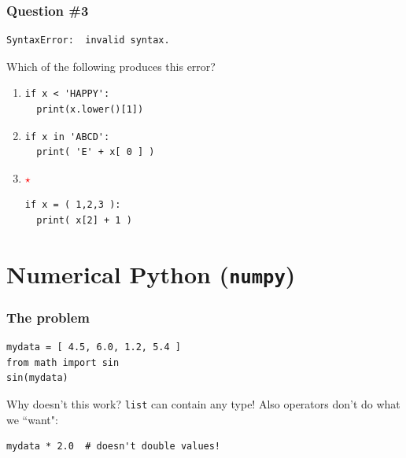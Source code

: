 \documentclass[11pt]{beamer}
\newcommand{\correctstar}{\textcolor{red}{$\star$}}
\begin{document}
\begin{frame}[fragile]
  \frametitle{Question \#3}
  \Enlarge

  \begin{Verbatim}
SyntaxError:  invalid syntax.
  \end{Verbatim}

  Which of the following produces this error?

  \begin{enumerate}[label=\Alph*]
  \item
  \begin{Verbatim}
if x < 'HAPPY':
  print(x.lower()[1])
  \end{Verbatim}
  \item
  \begin{Verbatim}
if x in 'ABCD':
  print( 'E' + x[ 0 ] )
  \end{Verbatim}
  \item  \correctstar
  \begin{Verbatim}
if x = ( 1,2,3 ):
  print( x[2] + 1 )
  \end{Verbatim}
  \end{enumerate}
\end{frame}

\section{Numerical Python (\texttt{numpy})}

\begin{frame}[fragile]
  \frametitle{The problem}
  \Enlarge

  \begin{Verbatim}
mydata = [ 4.5, 6.0, 1.2, 5.4 ]
from math import sin
sin(mydata)
  \end{Verbatim}
  \begin{enumerate}
  \myitem  Why doesn't this work? %
  \mysubitem  \texttt{list} can contain any type!
  \myitem  Also operators don't do what we ``want":
  \end{enumerate}
  \begin{Verbatim}
mydata * 2.0  # doesn't double values!
  \end{Verbatim}
\end{frame}
\end{document}
